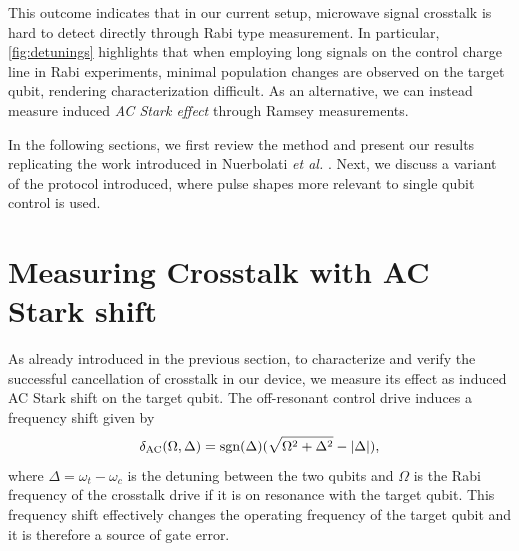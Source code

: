 This outcome indicates that in our current setup, microwave signal crosstalk is hard to detect directly through Rabi type measurement.
In particular, \cref{fig:detunings} highlights that when employing long signals on the control charge line in Rabi experiments, minimal population changes are observed on the target qubit, rendering characterization difficult.
As an alternative, we can instead measure induced \emph{AC Stark effect} \cite{AC_starl} through Ramsey measurements.

In the following sections, we first review the method and present our results replicating the work introduced in Nuerbolati \emph{et al.} \cite{crosstalk}.
Next, we discuss a variant of the protocol introduced, where pulse shapes more relevant to single qubit control is used. 



\section{Measuring Crosstalk with AC Stark shift}

As already introduced in the previous section, to characterize and verify the successful cancellation of crosstalk in our device, we measure its effect as induced AC Stark shift on the target qubit.
The off-resonant control drive induces a frequency shift given by
\begin{equation}
\label{eq:stark_ac}
    \delta_{\text{AC}} (\Omega, \Delta) = 
    \text{sgn} (\Delta) ( \sqrt{\Omega^2 + \Delta^2} - |\Delta|) ,
\end{equation}
where $\Delta = \omega_t - \omega_c$ is the detuning between the two qubits and $\Omega$ is the Rabi frequency of the crosstalk drive if it is on resonance with the target qubit.
This frequency shift effectively changes the operating frequency of the target qubit and it is therefore a source of gate error.


